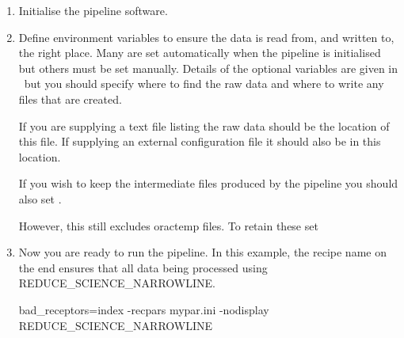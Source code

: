 \documentclass[11pt,oneside,chapters]{starlink}
\begin{document}
\begin{enumerate}[label=(\textbf{\arabic*})]

\item Initialise the pipeline software.
\begin{terminalv}
\end{terminalv}

\item Define environment variables to ensure the data is read from,
and written to, the right place. Many are set automatically when the
pipeline is initialised but others must be set manually. Details of
the optional variables are given in \pipelinesun\ but you should
specify where to find the raw data and where to write any files that
are created.
\begin{terminalv}
\end{terminalv}

If you are supplying a text file listing the raw data
 should be the location of this file. If
supplying an external configuration file it should also be in this
location.

If you wish to keep the intermediate files produced by the pipeline
you should also set .
\begin{terminalv}
\end{terminalv}
However, this still excludes oractemp files. To retain these set
\begin{terminalv}
\end{terminalv}

\item Now you are ready to run the pipeline. In this example, the
recipe name on the end ensures that all data being processed using
REDUCE\_SCIENCE\_NARROWLINE.

\begin{terminalv}
  bad_receptors=index -recpars mypar.ini -nodisplay
REDUCE_SCIENCE_NARROWLINE
\end{terminalv}
\end{enumerate}
\end{document}
